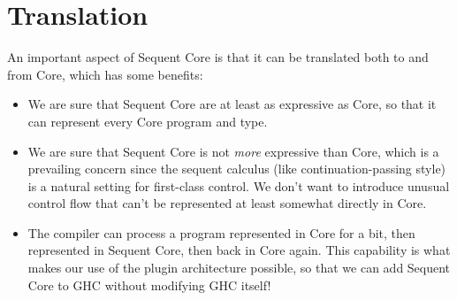 \documentclass{article}
\begin{document}
\section{Translation}
\label{sec:translation}

An important aspect of Sequent Core is that it can be translated both to and
from Core, which has some benefits:
\begin{itemize}
\item We are sure that Sequent Core are at least as expressive as Core, so that
  it can represent every Core program and type.
\item We are sure that Sequent Core is not \emph{more} expressive than Core,
  which is a prevailing concern since the sequent calculus (like
  continuation-passing style) is a natural setting for first-class control.  We
  don't want to introduce unusual control flow that can't be represented at
  least somewhat directly in Core.
\item The compiler can process a program represented in Core for a bit, then
  represented in Sequent Core, then back in Core again.  This capability is what
  makes our use of the plugin architecture possible, so that we can add Sequent
  Core to GHC without modifying GHC itself!
\end{itemize}
\end{document}
